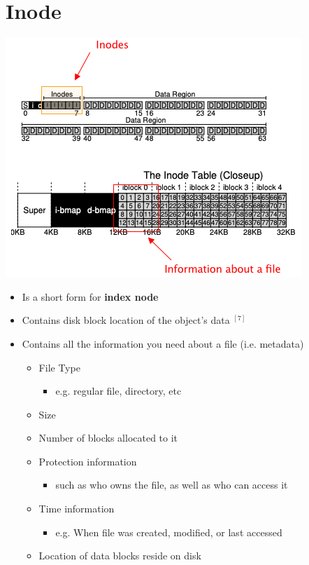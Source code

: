 \documentclass[12pt]{article}
\begin{document}
\section*{Inode}

\begin{center}
\includegraphics[width=\linewidth]{images/midterm_1_solution_12.png}
\end{center}

\begin{itemize}
    \item Is a short form for \textbf{index node}
    \item Contains disk block location of the object's data $^{[7]}$
    \item Contains all the information you need about a file (i.e. metadata)

    \begin{itemize}
        \item File Type
        \begin{itemize}
            \item e.g. regular file, directory, etc
        \end{itemize}
        \item Size
        \item Number of blocks allocated to it
        \item Protection information
        \begin{itemize}
            \item such as who owns the file, as well as who can access it
        \end{itemize}
        \item Time information
        \begin{itemize}
            \item e.g. When file was created, modified, or last accessed
        \end{itemize}
        \item Location of data blocks reside on disk
    \end{itemize}
\end{itemize}
\end{document}
